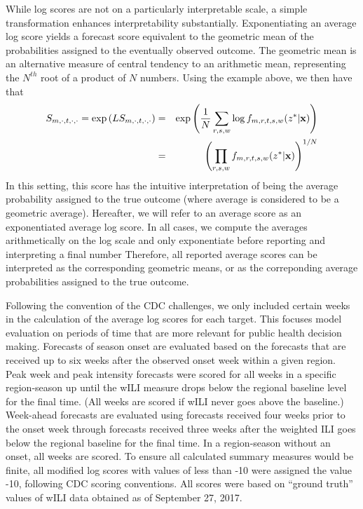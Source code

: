 \documentclass{article}
\begin{document}
While log scores are not on a particularly interpretable scale, a simple transformation enhances interpretability substantially.
Exponentiating an average log score yields a forecast score equivalent to the geometric mean of the probabilities assigned to the eventually observed outcome. 
The geometric mean is an alternative measure of central tendency to an arithmetic mean, representing the $N^{th}$ root of a product of $N$ numbers. 
Using the example above, we then have that
\begin{eqnarray}
S_{m,\cdot,t,\cdot,\cdot} = \exp \left ( LS_{m,\cdot,t,\cdot,\cdot} \right ) & = & \exp \left ( \frac{1}{N} \sum_{r,s,w} \log f_{m,r,t,s,w}(z^*|{\bf x}) \right ) \\
 & = & \left ( \prod_{r,s,w}  f_{m,r,t,s,w}(z^*|{\bf x}) \right ) ^{1/N} 
\end{eqnarray}
In this setting, this score has the intuitive interpretation of being the average probability assigned to the true outcome (where average is considered to be a geometric average).
Hereafter, we will refer to an average score as an exponentiated average log score.
In all cases, we compute the averages arithmetically on the log scale and only exponentiate before reporting and interpreting a final number
Therefore, all reported average scores can be interpreted as the corresponding geometric means, or as the correponding average probabilities assigned to the true outcome.

Following the convention of the CDC challenges, we only included certain weeks in the calculation of the average log scores for each target.
This focuses model evaluation on periods of time that are more relevant for public health decision making.
Forecasts of season onset are evaluated based on the forecasts that are received up to six weeks after the observed onset week within a given region.
Peak week and peak intensity forecasts were scored for all weeks in a specific region-season up until the wILI measure drops below the regional baseline level for the final time. 
(All weeks are scored if wILI never goes above the baseline.)
Week-ahead forecasts are evaluated using forecasts received four weeks prior to the onset week through forecasts received three weeks after the weighted ILI goes below the regional baseline for the final time.
In a region-season without an onset, all weeks are scored.
To ensure all calculated summary measures would be finite, all modified log scores with values of less than -10 were assigned the value -10, following CDC scoring conventions.
All scores were based on ``ground truth'' values of wILI data obtained as of September 27, 2017.
\end{document}
